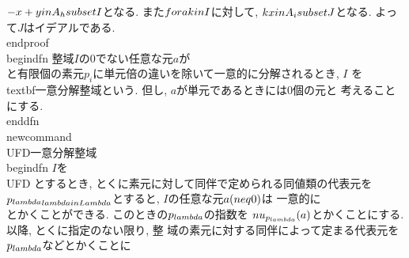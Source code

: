  $-x+y\\in A_{h}\\subset I$となる. また$\\fora k\\in I$に対して, $kx\\in
 A_{i}\\subset J$となる. よって$J$はイデアルである.
\\end{proof}
\
\\begin{dfn}
 整域$I$の$0$でない任意な元$a$が
 \\[
  a=p_{1}p_{2}\\cdots p_{n}
 \\]
 と有限個の素元$p_{i}$に単元倍の違いを除いて一意的に分解されるとき, $I$
 を\\textbf{一意分解整域}という. 但し, $a$が単元であるときには$0$個の元と
 考えることにする.
\\end{dfn}
\\newcommand{\\UFD}{一意分解整域}
\\begin{dfn}
 $I$を\\UFD とするとき, とくに素元に対して同伴で定められる同値類の代表元を
 $\\{p_{\\lambda}\\}_{\\lambda\\in \\Lambda}$とすると, $I$の任意な元$a(\\neq 0)$は
 一意的に
 \\[
 a=u\\prod_{\\lambda}p_{\\lambda}^{m_{\\lambda}}\\qquad (u\\in U,
 m_{\\lambda}\\neq 0\\text{となるのは有限個のみ})
 \\]
 とかくことができる. このときの$p_{\\lambda}$の指数を
 $\\nu_{p_{\\lambda}}(a)$とかくことにする. 以降, とくに指定のない限り, 整
 域の素元に対する同伴によって定まる代表元を$p_{\\lambda}$などとかくことに
